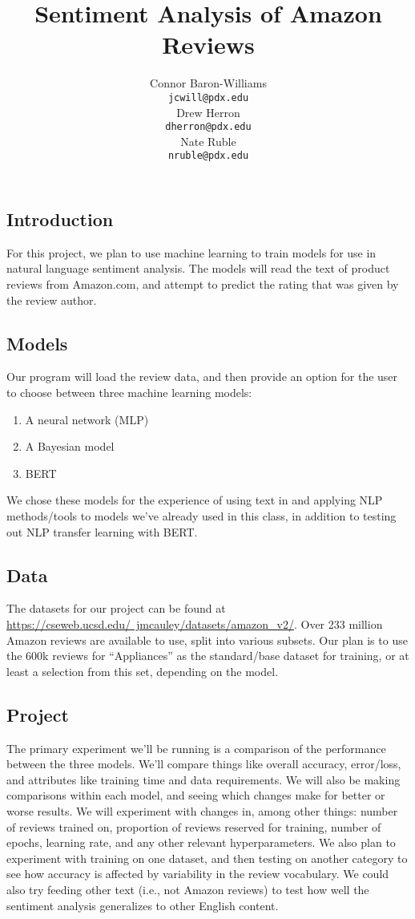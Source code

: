 \documentclass{article}
\date{\vspace{-5ex}}
\title{Sentiment Analysis of Amazon Reviews}
\author{
Connor Baron-Williams \\
\texttt{jcwill@pdx.edu} \\
\AND
Drew Herron \\
\texttt{dherron@pdx.edu} \\
\AND
Nate Ruble \\
\texttt{nruble@pdx.edu}
}
\begin{document}
\maketitle

\subsection*{Introduction}
For this project, we plan to use machine learning to train models for use in natural language sentiment analysis. The models will read the text of product reviews from Amazon.com, and attempt to predict the rating that was given by the review author.

\subsection*{Models}
Our program will load the review data, and then provide an option for the user to choose between three machine learning models:
\begin{enumerate}
\itemsep0em
\item A neural network (MLP)
\item A Bayesian model
\item BERT
\end{enumerate}
We chose these models for the experience of using text in and applying NLP methods/tools to models we've already used in this class, in addition to testing out NLP transfer learning with BERT.

\subsection*{Data}
The datasets for our project can be found at \href{https://cseweb.ucsd.edu/~jmcauley/datasets/amazon_v2/}{https://cseweb.ucsd.edu/~jmcauley/datasets/amazon\_v2/}. Over 233 million Amazon reviews are available to use, split into various subsets. Our plan is to use the 600k reviews for ``Appliances'' as the standard/base dataset for training, or at least a selection from this set, depending on the model.

\subsection*{Project}
The primary experiment we'll be running is a comparison of the performance between the three models. We'll compare things like overall accuracy, error/loss, and attributes like training time and data requirements. We will also be making comparisons within each model, and seeing which changes make for better or worse results. We will experiment with changes in, among other things: number of reviews trained on, proportion of reviews reserved for training, number of epochs, learning rate, and any other relevant hyperparameters. We also plan to experiment with training on one dataset, and then testing on another category to see how accuracy is affected by variability in the review vocabulary. We could also try feeding other text (i.e., not Amazon reviews) to test how well the sentiment analysis generalizes to other English content.
\end{document}
